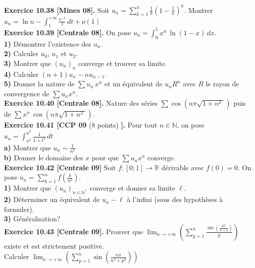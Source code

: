 \documentclass[a4paper,12pt,francais]{article}
\newcommand{\field}[1]{\mathbb{#1}}
\newcommand{\N}{\field{N}}
\newcommand{\R}{\field{R}}
\newcommand{\e}{\mbox{e}}
\begin{document}
\noindent
{\bf Exercice 10.38 [Mines 08].} Soit $u_n=\displaystyle \sum_{k=1}^n \frac{1}{k} \left({1-\frac{1}{n} }\right)^k.$ Montrer
$\displaystyle u_n=\ln n -\int_1^{+\infty} \frac{\e^{-t}}{t}\, dt+o(1)$\\

\noindent
{\bf Exercice 10.39 [Centrale 08].} On pose $u_n=\int_0^1 x^n \, \ln(1-x)\, dx$.\\
\indent
{\bf 1)} Démontrer l'existence des $u_n$.\\
\indent
{\bf 2)} Calculer $u_0$, $u_1$ et $u_2$.\\
\indent
{\bf 3)} Montrer que $(u_n)_n$ converge et trouver sa limite.\\
\indent
{\bf 4)} Calculer $(n+1)u_n-nu_{n-1}$.\\
\indent
{\bf 5)} Donner la nature de $\sum u_n\, x^n$ et un équivalent de $u_nR^n$ avec $R$ le rayon de convergence de $\sum u_n x^n$.\\

\noindent
{\bf Exercice 10.40 [Centrale 08].} Nature des séries $\sum \cos(n \pi \sqrt{1+n^2\;} )$ puis de  $\sum x^n \, \cos(n \pi \sqrt{1+n^2\;})$. \\

\noindent
{\bf Exercice 10.41 [CCP 09} (8 points) {\bf ].} Pour tout $n\in \N$, on pose $\displaystyle  u_n=\int_{n^2}^{n^3} \frac{1}{1+t^2}\, dt$\\
{\bf a)} Montrer que $u_n \sim \frac{1}{n^2}$\\
{\bf b)} Donner le domaine des $x$ pour que $\sum u_n x^n$ converge.\\

\noindent
{\bf Exercice 10.42 [Centrale 09]} Soit $f:[0;1] \to \R$ dérivable avec $f(0)=0$. On pose $u_n=\displaystyle \sum_{k=1}^n f \left( { \frac{k}{n^2}} \right)$.\\ 
{\bf 1)} Montrer que $(u_n)_{n \in \N^*}$ converge et donner sa limite $\ell$.\\
{\bf 2)} Déterminer un équivalent de $u_n-\ell$ à l'infini (sous des hypothèses à formuler).\\
{\bf 3)} Généralisation?\\

\noindent
{\bf Exercice 10.43 [Centrale 09].}
Prouver que $\displaystyle \lim_{n\to +\infty} \left( \sum_{p=1}^n \frac{ \sin \left( \frac{p\pi}{n+1} \right)}{p} \right)$ existe et est strictement positive.\\
Calculer $\displaystyle \lim_{n\to +\infty} \left( \sum_{p=1}^n \sin \left( \frac{n\pi}{n^2+p^2} \right) \right)$\\
\end{document}
